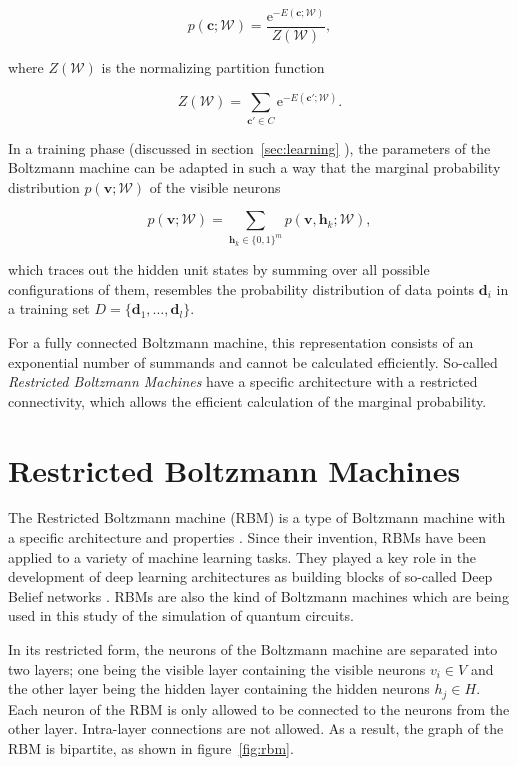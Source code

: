 \begin{equation}
   p(\bm{c};\mathcal{W}) = \frac{\mathrm{e}^{-E(\bm{c};\mathcal{W})}}{Z(\mathcal{W})},
\end{equation}

where $Z(\mathcal{W})$ is the normalizing partition function 

\begin{equation}
   Z(\mathcal{W}) = \sum_{\bm{c}\prime\in C} \mathrm{e}^{-E(\bm{c}\prime;\mathcal{W})}.
\end{equation}

In a training phase (discussed in section~\ref{sec:learning} ), the parameters of the Boltzmann machine can be adapted in such a way that 
the marginal probability distribution $p(\bm{v}; \mathcal{W})$ of the visible neurons

\begin{equation}
    \label{eq:gbm}
   p(\bm{v};\mathcal{W}) = \sum_{\bm{h}_k \in \{0,1\}^m} p(\bm{v},\bm{h}_k;\mathcal{W}),
\end{equation}

which traces out the hidden unit 
states by summing over all possible configurations of them, resembles the probability 
distribution of data points $\bm{d}_i$ in a training set $D=\{\bm{d}_1,\dots,\bm{d}_l\}$.

For a fully connected Boltzmann machine, this representation consists of an exponential number of summands and cannot be calculated efficiently. So-called \textit{Restricted Boltzmann Machines}
have a specific architecture with a restricted connectivity, which allows the efficient calculation of the marginal probability.

\section{Restricted Boltzmann Machines}
\label{sec:rbms}
The Restricted Boltzmann machine (RBM) is a type of Boltzmann machine with 
a specific architecture and properties \cite{smolensky1986information}. Since their invention, RBMs have been applied to a variety 
of machine learning tasks. They played a 
key role in the development of deep learning architectures as building blocks of so-called 
Deep Belief networks \cite{bengio2009learning, hinton2006fast}.
RBMs are also the kind of Boltzmann machines which are being used in this study of the simulation 
of quantum circuits.

In its restricted form, the neurons of the Boltzmann machine are separated into two layers;
one being the visible layer containing the visible neurons $v_i \in V$ and the other layer being the hidden layer containing the hidden neurons $h_j \in H$. Each neuron of the RBM 
is only allowed to be connected to the neurons from the other layer. Intra-layer connections are not allowed. As a result, the graph of the RBM is bipartite, as shown in figure~\ref{fig:rbm}. 

